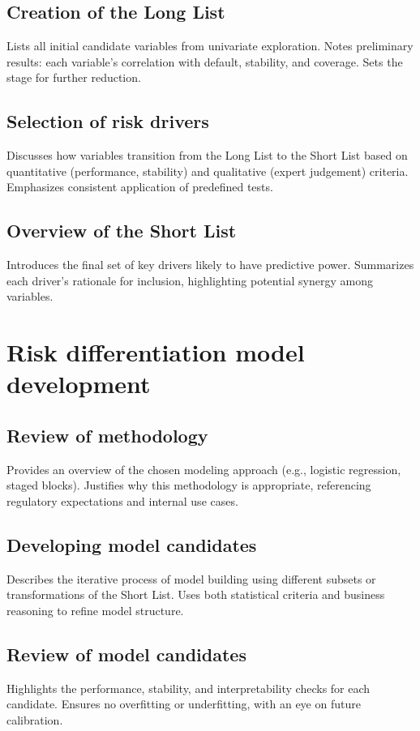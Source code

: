 \documentclass[12pt,a4paper]{article}
\begin{document}
\subsection{Creation of the Long List}
Lists all initial candidate variables from univariate exploration. Notes preliminary results: each variable’s correlation with default, stability, and coverage. Sets the stage for further reduction.

\subsection{Selection of risk drivers}
Discusses how variables transition from the Long List to the Short List based on quantitative (performance, stability) and qualitative (expert judgement) criteria. Emphasizes consistent application of predefined tests.

\subsection{Overview of the Short List}
Introduces the final set of key drivers likely to have predictive power. Summarizes each driver’s rationale for inclusion, highlighting potential synergy among variables.

\section{Risk differentiation model development}

\subsection{Review of methodology}
Provides an overview of the chosen modeling approach (e.g., logistic regression, staged blocks). Justifies why this methodology is appropriate, referencing regulatory expectations and internal use cases.

\subsection{Developing model candidates}
Describes the iterative process of model building using different subsets or transformations of the Short List. Uses both statistical criteria and business reasoning to refine model structure.

\subsection{Review of model candidates}
Highlights the performance, stability, and interpretability checks for each candidate. Ensures no overfitting or underfitting, with an eye on future calibration.
\end{document}
